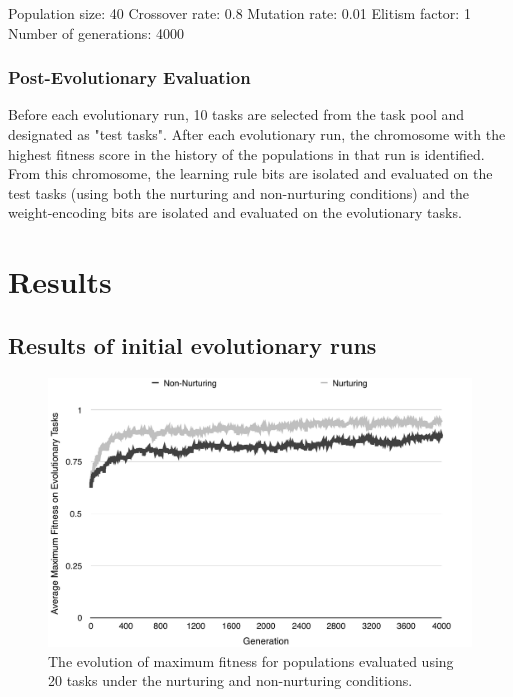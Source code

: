 \documentclass[master]{outhesis}
\begin{document}
Population size: 40
Crossover rate: 0.8
Mutation rate: 0.01
Elitism factor: 1
Number of generations: 4000

\subsection{Post-Evolutionary Evaluation}

Before each evolutionary run, 10 tasks are selected from the task pool and designated as "test tasks". After each evolutionary run, the chromosome with the highest fitness score in the history of the populations in that run is identified. From this chromosome, the learning rule bits are isolated and evaluated on the test tasks (using both the nurturing and non-nurturing conditions) and the weight-encoding bits are isolated and evaluated on the evolutionary tasks.

\chapter{Results}

\section{Results of initial evolutionary runs}

\begin{figure}[H]
	\centering
	\includegraphics{ChalmersEvolution.pdf}
	\caption{The evolution of maximum fitness for populations evaluated using 20 tasks under the nurturing and non-nurturing conditions.}
\end{figure}
\end{document}

